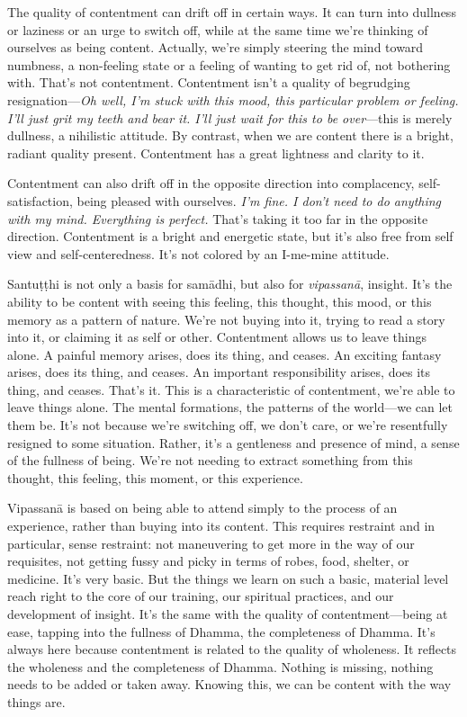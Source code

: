 The quality of contentment can drift off in certain ways. It can turn 
into dullness or laziness or an urge to switch off, while at the same 
time we're thinking of ourselves as being content. Actually, we're 
simply steering the mind toward numbness, a non-feeling state or a 
feeling of wanting to get rid of, not bothering with. That's not 
contentment. Contentment isn't a quality of begrudging 
resignation---\emph{Oh well, I'm stuck with this mood, this particular 
problem or feeling. I'll just grit my teeth and bear it. I'll just wait 
for this to be over}---this is merely dullness, a nihilistic attitude. 
By contrast, when we are content there is a bright, radiant quality 
present. Contentment has a great lightness and clarity to it.

Contentment can also drift off in the opposite direction into 
complacency, self-satisfaction, being pleased with ourselves. \emph{I'm 
fine. I don't need to do anything with my mind. Everything is perfect.} 
That's taking it too far in the opposite direction. Contentment is a 
bright and energetic state, but it's also free from self view and 
self-centeredness. It's not colored by an I-me-mine attitude.

Santuṭṭhi is not only a basis for samādhi, but also for 
\emph{vipassanā}, insight. It's the ability to be content with seeing 
this feeling, this thought, this mood, or this memory as a pattern of 
nature. We're not buying into it, trying to read a story into it, or 
claiming it as self or other. Contentment allows us to leave things 
alone. A painful memory arises, does its thing, and ceases. An exciting 
fantasy arises, does its thing, and ceases. An important responsibility 
arises, does its thing, and ceases. That's it. This is a characteristic 
of contentment, we're able to leave things alone. The mental 
formations, the patterns of the world---we can let them be. It's not 
because we're switching off, we don't care, or we're resentfully 
resigned to some situation. Rather, it's a gentleness and presence of 
mind, a sense of the fullness of being. We're not needing to extract 
something from this thought, this feeling, this moment, or this 
experience.

Vipassanā is based on being able to attend simply to the process of an 
experience, rather than buying into its content. This requires 
restraint and in particular, sense restraint: not maneuvering to get 
more in the way of our requisites, not getting fussy and picky in terms 
of robes, food, shelter, or medicine. It's very basic. But the things 
we learn on such a basic, material level reach right to the core of our 
training, our spiritual practices, and our development of insight. It's 
the same with the quality of contentment---being at ease, tapping into 
the fullness of Dhamma, the completeness of Dhamma. It's always here 
because contentment is related to the quality of wholeness. It reflects 
the wholeness and the completeness of Dhamma. Nothing is missing, 
nothing needs to be added or taken away. Knowing this, we can be 
content with the way things are.


